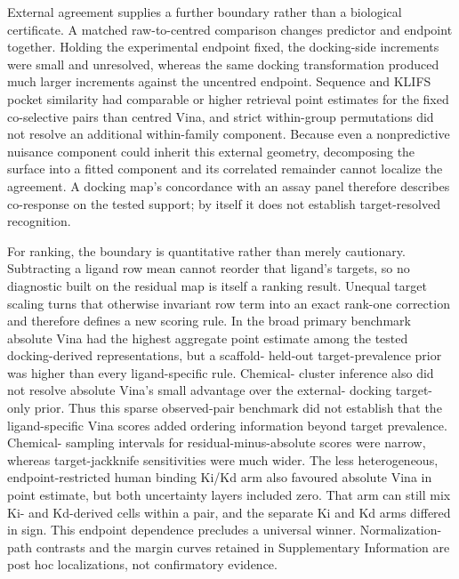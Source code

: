 \documentclass[11pt]{article}
\begin{document}
External agreement supplies a further boundary rather than a biological certificate. A
matched raw-to-centred comparison changes predictor and endpoint together. Holding the
experimental endpoint fixed, the docking-side increments were small and unresolved, whereas
the same docking transformation produced much larger increments against the uncentred
endpoint. Sequence and KLIFS pocket similarity had comparable or higher retrieval point
estimates for the fixed co-selective pairs than centred Vina, and strict within-group
permutations did not resolve an
additional within-family component. Because even a nonpredictive nuisance component could
inherit this external geometry, decomposing the surface into a fitted component and its
correlated remainder cannot localize the agreement. A docking map's concordance with an
assay panel therefore describes co-response on the tested support; by itself it does not
establish target-resolved recognition.

For ranking, the boundary is quantitative rather than merely cautionary. Subtracting a
ligand row mean cannot reorder that ligand's targets, so no diagnostic built on the residual
map is itself a ranking result. Unequal target scaling turns that otherwise invariant row
term into an exact rank-one correction and therefore defines a new scoring rule. In the broad
primary benchmark absolute Vina had the highest aggregate point estimate among the tested
docking-derived representations, but a scaffold-
held-out target-prevalence prior was higher than every ligand-specific rule. Chemical-
cluster inference also did not resolve absolute Vina's small advantage over the external-
docking target-only prior. Thus this sparse observed-pair benchmark did not establish that
the ligand-specific Vina scores added ordering information beyond target prevalence.
Chemical-
sampling intervals for residual-minus-absolute scores were narrow, whereas target-jackknife
sensitivities were much wider. The less heterogeneous, endpoint-restricted human binding
Ki/Kd arm also favoured absolute Vina in point estimate, but both uncertainty layers included
zero. That arm can still mix Ki- and Kd-derived cells within a pair, and the separate Ki and
Kd arms differed in sign.
This endpoint dependence precludes a universal winner. Normalization-path contrasts and the
margin curves retained in Supplementary Information are post hoc localizations, not
confirmatory evidence.
\end{document}
